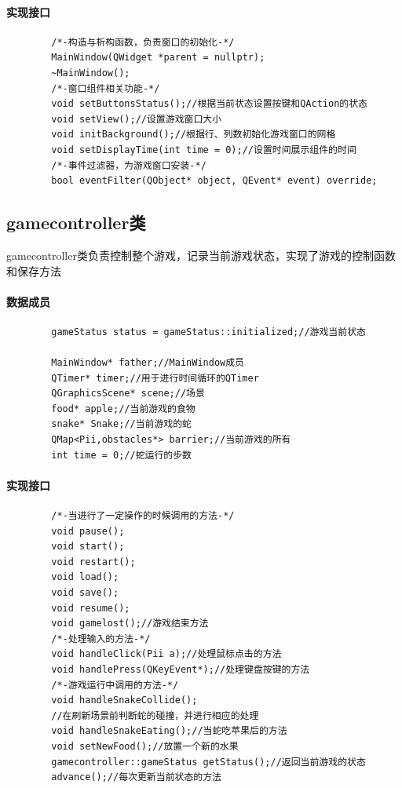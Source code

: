 \documentclass[utf-8]{ctexart}
\begin{document}
    \paragraph{实现接口}
    \begin{lstlisting}
        /*-构造与析构函数，负责窗口的初始化-*/
        MainWindow(QWidget *parent = nullptr);
        ~MainWindow();
        /*-窗口组件相关功能-*/
        void setButtonsStatus();//根据当前状态设置按键和QAction的状态
        void setView();//设置游戏窗口大小
        void initBackground();//根据行、列数初始化游戏窗口的网格
        void setDisplayTime(int time = 0);//设置时间展示组件的时间
        /*-事件过滤器，为游戏窗口安装-*/
        bool eventFilter(QObject* object, QEvent* event) override;
    \end{lstlisting}
    \subsection{gamecontroller类}
    gamecontroller类负责控制整个游戏，记录当前游戏状态，实现了游戏的控制函数和保存方法
    \paragraph{数据成员}
    \begin{lstlisting}
        gameStatus status = gameStatus::initialized;//游戏当前状态

        MainWindow* father;//MainWindow成员
        QTimer* timer;//用于进行时间循环的QTimer
        QGraphicsScene* scene;//场景
        food* apple;//当前游戏的食物
        snake* Snake;//当前游戏的蛇
        QMap<Pii,obstacles*> barrier;//当前游戏的所有
        int time = 0;//蛇运行的步数
    \end{lstlisting}
    \paragraph{实现接口}
    \begin{lstlisting}
        /*-当进行了一定操作的时候调用的方法-*/
        void pause();
        void start();
        void restart();
        void load();
        void save();
        void resume();
        void gamelost();//游戏结束方法
        /*-处理输入的方法-*/
        void handleClick(Pii a);//处理鼠标点击的方法
        void handlePress(QKeyEvent*);//处理键盘按键的方法
        /*-游戏运行中调用的方法-*/
        void handleSnakeCollide();
        //在刷新场景前判断蛇的碰撞，并进行相应的处理
        void handleSnakeEating();//当蛇吃苹果后的方法
        void setNewFood();//放置一个新的水果
        gamecontroller::gameStatus getStatus();//返回当前游戏的状态
        advance();//每次更新当前状态的方法
    \end{lstlisting}
\end{document}
